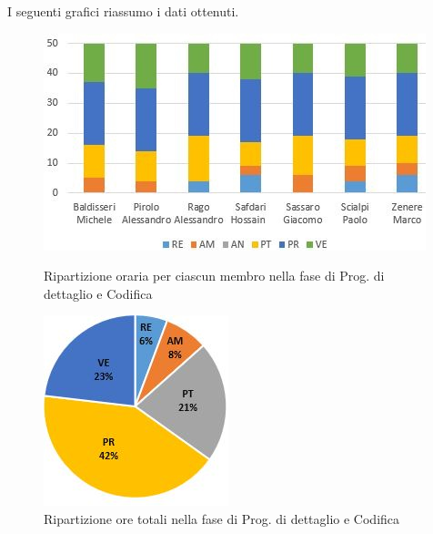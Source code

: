 I seguenti grafici riassumo i dati ottenuti.

\begin{figure}[!htb]
   \begin{minipage}{0.6\textwidth}
     \centering
     \includegraphics{Images/PO-Codifica}
     \caption{Ripartizione oraria per ciascun membro nella fase di Prog. di dettaglio e Codifica}
   \end{minipage}\hspace{0.1\textwidth}
   \begin{minipage}{0.3\textwidth}
     \centering
     \includegraphics[width=.9\textwidth]{Images/PE-Codifica}
     \captionsetup{width=.9\textwidth}
     \caption{Ripartizione ore totali nella fase di Prog. di dettaglio e Codifica}
   \end{minipage}
\end{figure}

\newpage